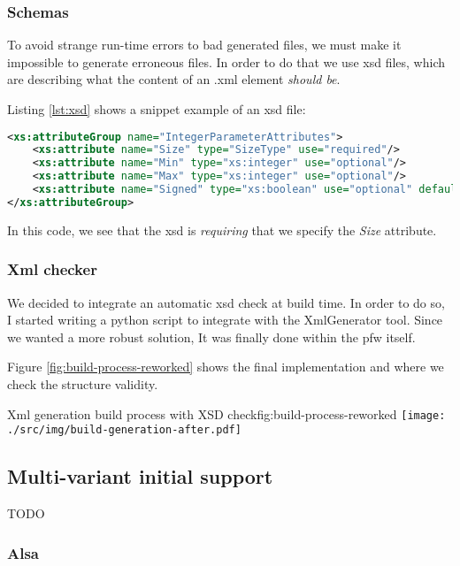 \subsubsection{Schemas}
To avoid strange run-time errors to bad generated files, we must make it impossible to generate erroneous files.
In order to do that we use \gls{xsd} files, which are describing what the content of an .xml element \emph{should be}.

Listing \ref{lst:xsd} shows a snippet example of an \gls{xsd} file:

\begin{lstlisting}[language=XML, caption=XSD rules for an Integer parameter, label=lst:xsd]
<xs:attributeGroup name="IntegerParameterAttributes">
    <xs:attribute name="Size" type="SizeType" use="required"/>
    <xs:attribute name="Min" type="xs:integer" use="optional"/>
    <xs:attribute name="Max" type="xs:integer" use="optional"/>
    <xs:attribute name="Signed" type="xs:boolean" use="optional" default="false"/>
</xs:attributeGroup>
\end{lstlisting}

In this code, we see that the \gls{xsd} is \emph{requiring} that we specify the \emph{Size} attribute.

\subsubsection{Xml checker}
We decided to integrate an automatic \gls{xsd} check at build time. In order to do so, I started writing a \gls{python} script
to integrate with the XmlGenerator tool. Since we wanted a more robust solution, It was finally done within the \gls{pfw} itself.

Figure \ref{fig:build-process-reworked} shows the final implementation and where we check the structure validity.

\begin{figureGraphics}{Xml generation build process with XSD check}{fig:build-process-reworked}
    \texttt{[image: ./src/img/build-generation-after.pdf]}
\end{figureGraphics}


\subsection{Multi-variant initial support}
TODO

\subsubsection{Alsa}
